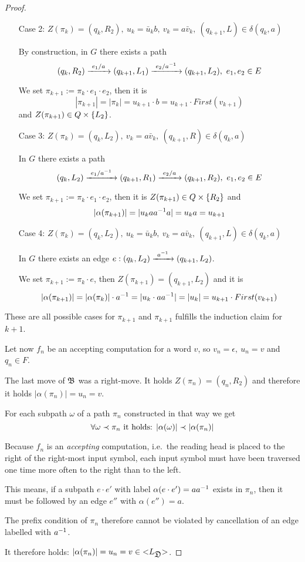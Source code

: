 \begin{proof}
\begin{itemize}
  \item[Case 2:] $Z(\pi_k) = (q_k, R_2),\ u_k = \bar{u}_k b,\ v_k = a
  \bar{v}_k,\ (q_{k+1}, L) \in \delta(q_k, a)$
  
  By construction, in $G$ there exists a path
  \[ (q_k, R_2) \xrightarrow{\ {e_1 / a}\ } (q_{k+1}, L_1) \xrightarrow{\ {e_2 / {{a}^{-1}}}\ } (q_{k+1},
  L_2),\ e_1, e_2 \in E \]
  
  We set $\pi_{k+1} := \pi_k \cdot e_1 \cdot e_2$, then it is
  \[ |\pi_{k+1}| = |\pi_k| = u_{k+1} \cdot b = u_{k+1} \cdot First(v_{k+1}) \]
  and $Z(\pi_{k+1}) \in Q \times \mbox{$\{L_2\}$}$.
  
  \item[Case 3:] $Z(\pi_k) = (q_k, L_2),\ v_k = a \bar{v}_k,\ (q_{k+1}, R) \in
  \delta(q_k, a)$
  
  In $G$ there exists a path 
  \[ (q_k, L_2) \xrightarrow{\ {e_1 / {{a}^{-1}}}\ } (q_{k+1}, R_1) \xrightarrow{\ {e_2 / a}\ } (q_{k+1},
  R_2),\ e_1, e_2 \in E \]
  
  We set $\pi_{k+1} := \pi_k \cdot e_1 \cdot e_2$, then it is $Z(\pi_{k+1}) \in
  Q \times \mbox{$\{R_2\}$}$ and
  \[ |\alpha(\pi_{k+1})| = |u_k a {{a}^{-1}} a| = u_k a = u_{k+1} \]
  
  \item[Case 4:] $Z(\pi_k) = (q_k, L_2),\ u_k = \bar{u}_k b,\ v_k = a
  \bar{v}_k,\ (q_{k+1}, L) \in \delta(q_k, a)$
  
  In $G$ there exists an edge $e: (q_k, L_2) \xrightarrow{\ {{{a}^{-1}}}\ } (q_{k+1}, L_2)$.
  
  We set $\pi_{k+1} := \pi_k \cdot e$, then $Z(\pi_{k+1}) = (q_{k+1}, L_2)$ and
  it is
  \[ |\alpha(\pi_{k+1})| = |\alpha(\pi_k)| \cdot {{a}^{-1}} = |u_k \cdot a {{a}^{-1}}|
  = |u_k| = u_{k+1} \cdot First(v_{k+1}) \]
\end{itemize}

These are all possible cases for $\pi_{k+1}$ and $\pi_{k+1}$ fulfills the
induction claim for $k+1$.

Let now $f_n$ be an accepting computation for a word $v$, so $v_n = \epsilon,\
u_n = v$ and $q_n \in F$.

The last move of $\mbox{$\mathfrak{B}$}$ was a right-move. It holds $Z(\pi_n) = (q_n, R_2)$ and
therefore it holds $|\alpha(\pi_n)| = u_n = v$.

For each subpath $\omega$ of a path $\pi_n$ constructed in that way we get
\[ \forall \omega \prec \pi_n \text{ it holds: }|\alpha(\omega)| \prec
|\alpha(\pi_n)| \]

Because $f_n$ is an {\em accepting} computation, i.e.\ the reading head is
placed to the right of the right-most input symbol, each input symbol must have 
been traversed one time more often to the right than to the left.

This means, if a subpath $e \cdot e'$ with label $\alpha(e \cdot e') = a
{{a}^{-1}}$ exists in $\pi_n$, then it must be followed by an edge $e''$ with
$\alpha(e'') = a$.

The prefix condition of $\pi_n$ therefore cannot be violated by cancellation of
an edge labelled with ${{a}^{-1}}$.

It therefore holds: $|\alpha(\pi_n)| = u_n = v \in \mbox{${<}{L_{\mbox{$\mathfrak{D}$}}}{>}$}$.
\end{proof}

